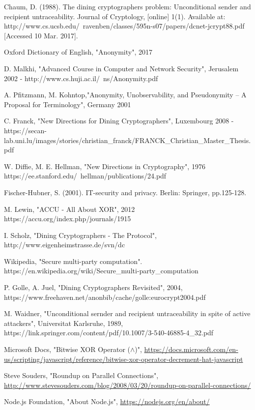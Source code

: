 \documentclass[12pt]{informatics-report}
\begin{document}


\begin{thebibliography}{99}

 Chaum, D. (1988). The dining cryptographers problem: Unconditional sender and recipient untraceability. Journal of Cryptology, [online] 1(1). Available at: http://www.cs.ucsb.edu/~ravenben/classes/595n-s07/papers/dcnet-jcrypt88.pdf [Accessed 10 Mar. 2017].

 Oxford Dictionary of English, "Anonymity", 2017

 D. Malkhi, "Advanced Course in Computer and Network Security", Jerusalem 2002 - http://www.cs.huji.ac.il/~ns/Anonymity.pdf

 A. Pfitzmann, M. Kohntop,"Anonymity, Unobservability, and Pseudonymity – A Proposal for Terminology", Germany 2001

 C. Franck, "New Directions for Dining Cryptographers", Luxembourg 2008 - https://secan-lab.uni.lu/images/stories/christian{\_}franck/FRANCK{\_}Christian{\_}Master{\_}Thesis.pdf

 W. Diffie, M. E. Hellman, "New Directions in Cryptography", 1976 https://ee.stanford.edu/~hellman/publications/24.pdf

 Fischer-Hubner, S. (2001). IT-security and privacy. Berlin: Springer, pp.125-128.

 M. Lewin, "ACCU - All About XOR", 2012 https://accu.org/index.php/journals/1915

 I. Scholz, "Dining Cryptographers - The Protocol", http://www.eigenheimstrasse.de/svn/dc

 Wikipedia, "Secure multi-party computation". https://en.wikipedia.org/wiki/Secure{\_}multi-party{\_}computation

 P. Golle, A. Juel, "Dining Cryptographers Revisited", 2004, https://www.freehaven.net/anonbib/cache/golle:eurocrypt2004.pdf 

 M. Waidner, "Unconditional sernder and recipient untraceability in spite of active attackers", Universitat Karlsruhe, 1989, https://link.springer.com/content/pdf/10.1007/3-540-46885-4{\_}32.pdf

 Microsoft Docs, "Bitwise XOR Operator ($\wedge$)", \url{https://docs.microsoft.com/en-us/scripting/javascript/reference/bitwise-xor-operator-decrement-hat-javascript}

 Steve Souders, "Roundup on Parallel Connections", \url{http://www.stevesouders.com/blog/2008/03/20/roundup-on-parallel-connections/}

 Node.js Foundation, "About Node.js", \url{https://nodejs.org/en/about/}


\end{thebibliography}



%
%
\end{document}
